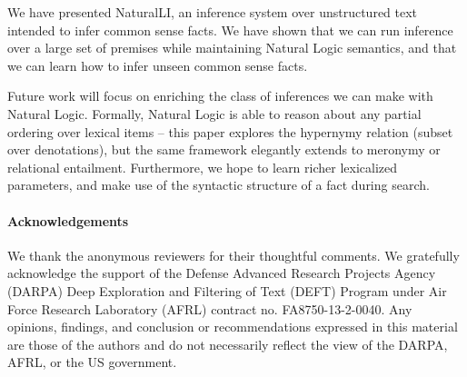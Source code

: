 We have presented NaturalLI, an inference system over
  unstructured text intended to infer common sense facts.
We have shown that we can run inference over a large set of premises
  while maintaining Natural Logic semantics, and that
  we can learn how to infer unseen common sense facts.

Future work will focus on enriching the class of inferences we can
  make with Natural Logic.
Formally, Natural Logic is able to reason about any partial ordering
  over lexical items -- this paper explores the hypernymy relation
  (subset over denotations), but the same framework elegantly extends
  to meronymy or relational entailment.
Furthermore, we hope to learn richer lexicalized parameters,
  and make use of the syntactic structure of a fact during search.

\vspace{1.5ex}
{\footnotesize
\paragraph{\footnotesize Acknowledgements}
We thank the anonymous reviewers for their thoughtful comments.
We gratefully acknowledge the support of the Defense
Advanced Research Projects Agency (DARPA) Deep Exploration and Filtering
of Text (DEFT) Program under Air Force Research Laboratory (AFRL)
contract no. FA8750-13-2-0040. Any opinions, findings, and conclusion or
recommendations expressed in this material are those of the authors and
do not necessarily reflect the view of the DARPA, AFRL, or the US
government.

}
